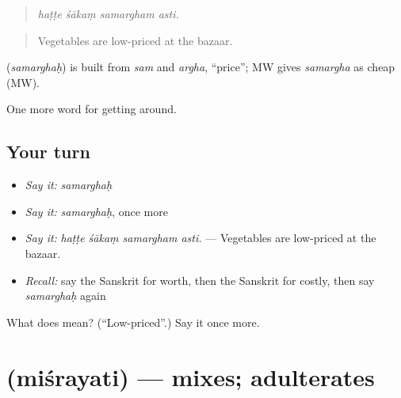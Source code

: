 \begin{quote}
   
\end{quote}

\begin{quote}
\emph{haṭṭe śākaṃ samargham asti.}
\end{quote}

\begin{quote}
Vegetables are low-priced at the bazaar.
\end{quote}

\begin{cousinweb}
\textbf{} (\emph{samarghaḥ}) is built from \emph{sam} and \emph{argha}, \textquotedblleft{}price\textquotedblright{}; MW gives \emph{samargha} as cheap (MW).
\end{cousinweb}

\begin{grammarlens}[title={What you've built}]
One more word for getting around.
\end{grammarlens}

\subsection*{Your turn}
\begin{itemize}
\raggedright
  \item \emph{Say it:} \emph{samarghaḥ}
  \item \emph{Say it:} \emph{samarghaḥ}, once more
  \item \emph{Say it:} \emph{haṭṭe śākaṃ samargham asti.} — Vegetables are low-priced at the bazaar.
  \item \emph{Recall:} say the Sanskrit for worth, then the Sanskrit for costly, then say \emph{samarghaḥ} again
\end{itemize}

\begin{tcolorbox}[breakable,colback=teal!4,colframe=teal!35!black,title={Before you move on}]
What does  mean? (\textquotedblleft{}Low-priced\textquotedblright{}.) Say it once more.
\end{tcolorbox}
\section[\texorpdfstring{\sk{मिश्रयति} (miśrayati)}{मिश्रयति (miśrayati)}]{ (miśrayati) — mixes; adulterates}

\label{lesson:SA-C431-misrayati}



